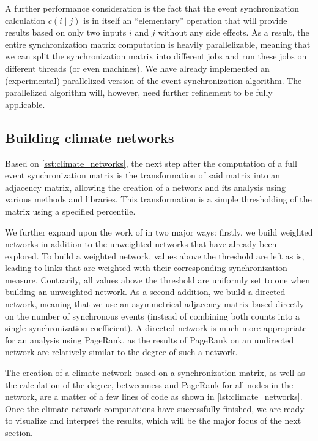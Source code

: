 A further performance consideration is the fact that the event synchronization calculation $c(i \mid j)$ is in itself an ``elementary'' operation that will provide results based on only two inputs $i$ and $j$ without any side effects. As a result, the entire synchronization matrix computation is heavily parallelizable, meaning that we can split the synchronization matrix into different jobs and run these jobs on different threads (or even machines). We have already implemented an (experimental) parallelized version of the event synchronization algorithm. The parallelized algorithm will, however, need further refinement to be fully applicable.

\clearpage
\subsection{Building climate networks}
\label{sst:building_climate_network}
Based on \cref{sst:climate_networks}, the next step after the computation of a full event synchronization matrix is the transformation of said matrix into an adjacency matrix, allowing the creation of a network and its analysis using various methods and libraries. This transformation is a simple thresholding of the matrix using a specified percentile.

We further expand upon the work of \citet{Stolbova.2015} in two major ways: firstly, we build weighted networks in addition to the unweighted networks that have already been explored. To build a weighted network, values above the threshold are left as is, leading to links that are weighted with their corresponding synchronization measure. Contrarily, all values above the threshold are uniformly set to one when building an unweighted network. As a second addition, we build a directed network, meaning that we use an asymmetrical adjacency matrix based directly on the number of synchronous events (instead of combining both counts into a single synchronization coefficient). A directed network is  much more appropriate for an analysis using PageRank, as the results of PageRank on an undirected network are relatively similar to the degree of such a network.

The creation of a climate network based on a synchronization matrix, as well as the calculation of the degree, betweenness and PageRank for all nodes in the network, are a matter of a few lines of code as shown in \cref{lst:climate_networks}. Once the climate network computations have successfully finished, we are ready to visualize and interpret the results, which will be the major focus of the next section.

